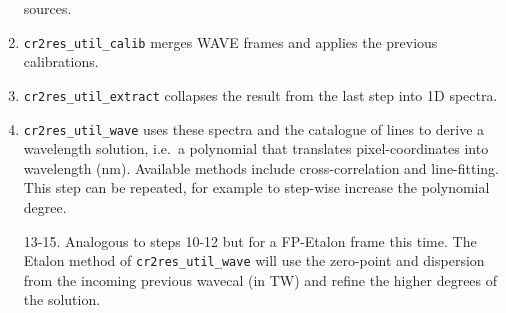 \begin{enumerate}
          sources.
    \item \texttt{cr2res\_util\_calib} merges WAVE frames and applies the
          previous
          calibrations.
    \item \texttt{cr2res\_util\_extract} collapses the result from the last
          step into
          1D spectra.
    \item \texttt{cr2res\_util\_wave} uses these spectra and the catalogue of
          lines to
          derive a wavelength solution, i.e.~a polynomial that translates
          pixel-coordinates
          into wavelength (nm). Available methods include cross-correlation and
          line-fitting. This step can be repeated, for example to step-wise
          increase the
          polynomial degree.
    \item[13-15.] Analogous to steps 10-12 but for a FP-Etalon frame this time.
          The Etalon method of \texttt{cr2res\_util\_wave} will use the
          zero-point
          and dispersion from the incoming previous wavecal (in TW) and refine
          the
          higher degrees of the solution.
\end{enumerate}